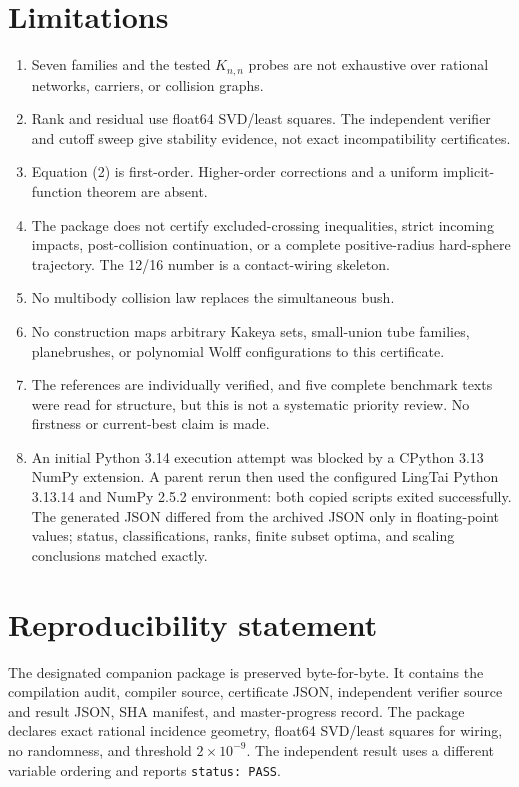\documentclass[11pt]{article}
\theoremstyle{definition}
\theoremstyle{remark}
\begin{document}
\section{Limitations}
\begin{enumerate}[leftmargin=2em]
\item Seven families and the tested $K_{n,n}$ probes are not exhaustive over rational networks, carriers, or collision graphs.
\item Rank and residual use float64 SVD/least squares. The independent verifier and cutoff sweep give stability evidence, not exact incompatibility certificates.
\item Equation (2) is first-order. Higher-order corrections and a uniform implicit-function theorem are absent.
\item The package does not certify excluded-crossing inequalities, strict incoming impacts, post-collision continuation, or a complete positive-radius hard-sphere trajectory. The 12/16 number is a contact-wiring skeleton.
\item No multibody collision law replaces the simultaneous bush.
\item No construction maps arbitrary Kakeya sets, small-union tube families, planebrushes, or polynomial Wolff configurations to this certificate.
\item The references are individually verified, and five complete benchmark texts were read for structure, but this is not a systematic priority review. No firstness or current-best claim is made.
\item An initial Python 3.14 execution attempt was blocked by a CPython 3.13 NumPy extension. A parent rerun then used the configured LingTai Python 3.13.14 and NumPy 2.5.2 environment: both copied scripts exited successfully. The generated JSON differed from the archived JSON only in floating-point values; status, classifications, ranks, finite subset optima, and scaling conclusions matched exactly.
\end{enumerate}

\section{Reproducibility statement}

The designated companion package is preserved byte-for-byte. It contains the compilation audit, compiler source, certificate JSON, independent verifier source and result JSON, SHA manifest, and master-progress record. The package declares exact rational incidence geometry, float64 SVD/least squares for wiring, no randomness, and threshold $2\times10^{-9}$. The independent result uses a different variable ordering and reports \texttt{status: PASS}.
\end{document}
